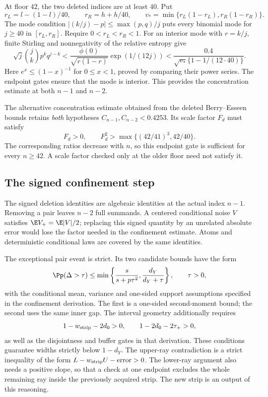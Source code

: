 At floor $42$, the two deleted indices are at least $40$. Put
\[
 r_L=l-(1-l)/40,\qquad r_R=h+h/40,
 \qquad v_*=\min\{r_L(1-r_L),r_R(1-r_R)\}.
\]
The mode condition $|(k/j)-p|\le\max(p,q)/j$ puts every binomial mode
for $j\ge40$ in $[r_L,r_R]$. Require $0<r_L<r_R<1$.
For an interior mode with $r=k/j$, finite Stirling and nonnegativity of
the relative entropy give
\[
 \sqrt j\binom jk p^kq^{j-k}
 <\frac{\phi(0)}{\sqrt{r(1-r)}}\exp(1/(12j))
 <\frac{0.4}{\sqrt{v_*}\{1-1/(12\cdot40)\}}.
\]
Here $e^x\le(1-x)^{-1}$ for $0\le x<1$, proved by comparing their
power series. The endpoint gates ensure that the mode is interior.
This provides the concentration estimate at both $n-1$ and $n-2$.

The alternative concentration estimate obtained from the deleted
Berry--Esseen bounds retains \emph{both} hypotheses
$C_{n-1},C_{n-2}<0.4253$. Its scale factor $F_d$ must satisfy
\[
 F_d>0,\qquad F_d^2>\max\{(42/41)^3,42/40\}.
\]
The corresponding ratios decrease with $n$, so this endpoint gate is
sufficient for every $n\ge42$. A scale factor checked only at the older
floor need not satisfy it.

\subsection{The signed confinement step}

The signed deletion identities are algebraic identities at the actual
index $n-1$. Removing a pair leaves $n-2$ full summands. A centered
conditional noise $V$ satisfies $\E V_+=\E|V|/2$; replacing this signed
quantity by an unrelated absolute error would lose the factor needed
in the confinement estimate. Atoms and deterministic conditional laws
are covered by the same identities.

The exceptional pair event is strict. Its two candidate bounds have
the form
\[
 \Pp(\Delta>\tau)\le
 \min\left\{\frac{s}{s+p\tau^2},\frac{d_Y}{d_Y+\tau}\right\},
 \qquad \tau>0,
\]
with the conditional mean, variance and one-sided support assumptions
specified in the confinement derivation. The first is a one-sided
second-moment bound; the second uses the same inner gap. The interval
geometry additionally requires
\[
 1-w_{\rm strip}-2d_0>0,\qquad 1-2d_0-2\tau_+>0,
\]
as well as the disjointness and buffer gates in that derivation. These
conditions guarantee widths strictly below $1-d_Y$. The upper-ray
contradiction is a strict inequality of the form
$L-w_{\rm strip} U-\mathrm{error}>0$. The lower-ray argument also needs a
positive slope, so that a check at one endpoint excludes the whole
remaining ray inside the previously acquired strip. The new strip is
an output of this reasoning.

